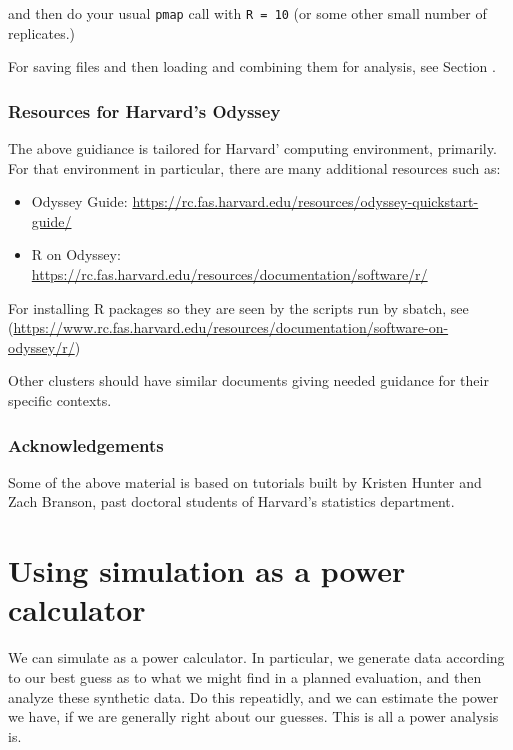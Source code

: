 \documentclass[
]{book}
\providecommand{\tightlist}{%
  \setlength{\itemsep}{0pt}\setlength{\parskip}{0pt}}
\begin{document}
and then do your usual \texttt{pmap} call with \texttt{R\ =\ 10} (or some other small number of replicates.)

For saving files and then loading and combining them for analysis, see Section \citet{saving_files}.

\hypertarget{resources-for-harvards-odyssey}{%
\subsection{Resources for Harvard's Odyssey}\label{resources-for-harvards-odyssey}}

The above guidiance is tailored for Harvard' computing environment, primarily.
For that environment in particular, there are many additional resources such as:

\begin{itemize}
\tightlist
\item
  Odyssey Guide: \url{https://rc.fas.harvard.edu/resources/odyssey-quickstart-guide/}
\item
  R on Odyssey: \url{https://rc.fas.harvard.edu/resources/documentation/software/r/}
\end{itemize}

For installing R packages so they are seen by the scripts run by sbatch, see (\url{https://www.rc.fas.harvard.edu/resources/documentation/software-on-odyssey/r/})

Other clusters should have similar documents giving needed guidance for their specific contexts.

\hypertarget{acknowledgements-1}{%
\subsection{Acknowledgements}\label{acknowledgements-1}}

Some of the above material is based on tutorials built by Kristen Hunter and Zach Branson, past doctoral students of Harvard's statistics department.

\hypertarget{using-simulation-as-a-power-calculator}{%
\chapter{Using simulation as a power calculator}\label{using-simulation-as-a-power-calculator}}

We can simulate as a power calculator.
In particular, we generate data according to our best guess as to what we might find in a planned evaluation, and then analyze these synthetic data.
Do this repeatidly, and we can estimate the power we have, if we are generally right about our guesses.
This is all a power analysis is.
\end{document}
